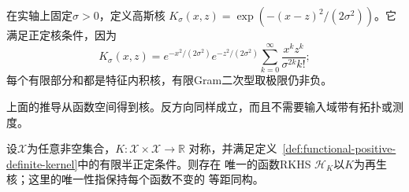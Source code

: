 在实轴上固定$\sigma>0$，定义高斯核
$K_\sigma(x,z)=\exp(-(x-z)^2/(2\sigma^2))$。它满足正定核条件，因为
\[
 K_\sigma(x,z)=
 e^{-x^2/(2\sigma^2)}e^{-z^2/(2\sigma^2)}
 \sum_{k=0}^{\infty}\frac{x^kz^k}{\sigma^{2k}k!};
\]
每个有限部分和都是特征内积核，有限Gram二次型取极限仍非负。

上面的推导从函数空间得到核。反方向同样成立，而且不需要输入域带有拓扑或测度。

\begin{theorem}[正定核的RKHS构造]
\label{thm:functional-moore-aronszajn-construction}
设$\mathcal{X}$为任意非空集合，$K:\mathcal{X}\times\mathcal{X}\to\mathbb{R}$
对称，并满足定义~\ref{def:functional-positive-definite-kernel}中的有限半正定条件。则存在
唯一的函数RKHS $\mathcal{H}_K$以$K$为再生核；这里的唯一性指保持每个函数不变的
等距同构。
\end{theorem}

